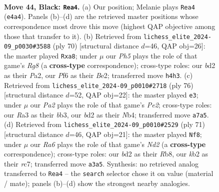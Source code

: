 \documentclass[11pt]{article}
\begin{document}
\clearpage

\begin{figure}[p]\centering
\begin{subfigure}{0.46\textwidth}\centering
\resizebox{\linewidth}{!}{%
\newchessgame
\chessboard[
  setfen={4n3/p1p5/2k2p1R/8/4rP1p/r7/1K1B3P/5BR1 b - - 3 44},
  showmover=false,
  pgfstyle=straightmove, color=movearrow, markmove={e4-a4}
]}
\caption{}
\end{subfigure}\hfill
\begin{subfigure}{0.46\textwidth}\centering
\resizebox{\linewidth}{!}{%
\newchessgame
\chessboard[
  setfen={r5R1/p1k2p2/2b5/3RP3/1PpP4/8/P1PKB2r/8 w - - 1 36},
  showmover=false,
  pgfstyle=straightmove, color=movearrow, markmove={g8-a8}
]}
\caption{}
\end{subfigure}
\\[4pt]
\begin{subfigure}{0.46\textwidth}\centering
\resizebox{\linewidth}{!}{%
\newchessgame
\chessboard[
  setfen={8/r1k2pp1/P2r4/1R6/1N1p1P2/1bp3P1/4PK2/2R5 w - - 0 39},
  showmover=false,
  pgfstyle=straightmove, color=movearrow, markmove={e2-e3}
]}
\caption{}
\end{subfigure}\hfill
\begin{subfigure}{0.46\textwidth}\centering
\resizebox{\linewidth}{!}{%
\newchessgame
\chessboard[
  setfen={1r4k1/2RnB1pp/4P3/8/1p1K4/1r6/7P/6R1 b - - 0 36},
  showmover=false,
  pgfstyle=straightmove, color=movearrow, markmove={d7-f8}
]}
\caption{}
\end{subfigure}
\caption{\textbf{Move 44, Black: \texttt{Rea4}.} (a) Our position; Melanie plays \texttt{Rea4} (\texttt{e4a4}). Panels (b)--(d) are the retrieved master positions whose correspondence most drove this move (highest QAP objective among those that transfer to it). (b) Retrieved from \texttt{lichess\_elite\_2024-09\_p0030\#3588} (ply 70) [structural distance $d$=46, QAP obj=26]: the master played \texttt{Rxa8}; under $\mu$ our \emph{Ph5} plays the role of that game's \emph{Rg8} (a \textbf{cross-type} correspondence); cross-type roles: our \emph{b}d2 as their \emph{P}a2, our \emph{P}f6 as their \emph{B}e2; transferred move \texttt{h4h3}. (c) Retrieved from \texttt{lichess\_elite\_2024-09\_p0010\#2718} (ply 76) [structural distance $d$=52, QAP obj=22]: the master played \texttt{e3}; under $\mu$ our \emph{Pa2} plays the role of that game's \emph{Pe2}; cross-type roles: our \emph{R}a3 as their \emph{b}b3, our \emph{b}d2 as their \emph{N}b4; transferred move \texttt{a7a5}. (d) Retrieved from \texttt{lichess\_elite\_2024-09\_p0010\#2529} (ply 71) [structural distance $d$=46, QAP obj=21]: the master played \texttt{Nf8}; under $\mu$ our \emph{Ra6} plays the role of that game's \emph{Nd2} (a \textbf{cross-type} correspondence); cross-type roles: our \emph{b}d2 as their \emph{R}b8, our \emph{k}b2 as their \emph{r}c7; transferred move \texttt{a3a5}. Synthesis: no retrieved analog transferred to \texttt{Rea4} -- the \texttt{search} selector chose it on value (material / mate); panels (b)--(d) show the strongest nearby analogies.}
\label{fig:thought-m87}
\end{figure}
\end{document}
